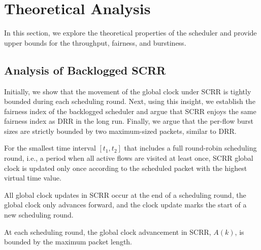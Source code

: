 \section{Theoretical Analysis}
\label{sec:scrr-analysis}

In this section, we explore the theoretical properties of the scheduler and provide upper bounds for the throughput, fairness, and burstiness.

\subsection{Analysis of Backlogged SCRR}
\label{sec:proofs}
Initially, we show that the movement of the global clock under SCRR is tightly bounded during each scheduling round. Next, using this insight, we establish the fairness index of the backlogged scheduler and argue that SCRR enjoys the same fairness index as DRR in the long run. Finally, we argue that the per-flow burst sizes are strictly bounded by two maximum-sized packets, similar to DRR.


\begin{definition}
\label{def:onlyonce}
For the smallest time interval $[t_1, t_2]$ that includes a full round-robin scheduling round, i.e., a period when all active flows are visited at least once,
SCRR global clock is updated only once according to the scheduled packet with the highest virtual time value.
\end{definition}

\begin{definition}
\label{def:correct}
All global clock updates in SCRR occur at the end of a scheduling round, the global clock only advances forward, and the clock update marks the start of a new scheduling round.
\end{definition}


\begin{theorem}
\label{theo:global}
At each scheduling round, the global clock advancement in SCRR, $A(k)$, is bounded by the maximum packet length.
\end{theorem}

